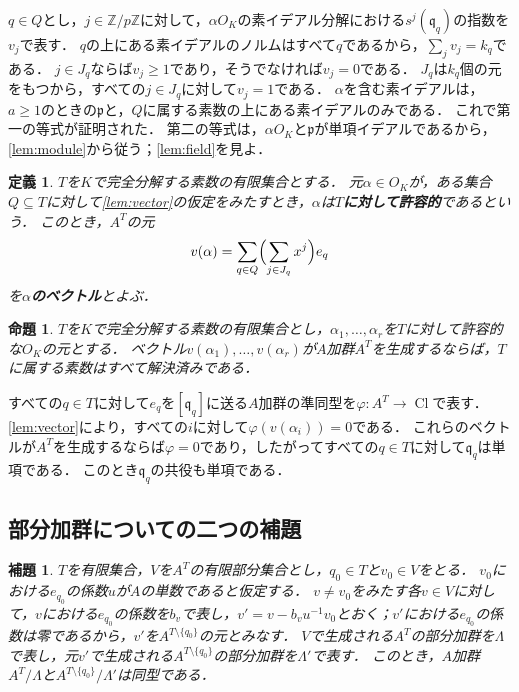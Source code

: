 \documentclass[11pt,a4paper]{ltjsarticle}
\makeatletter
\theoremstyle{ja}
\newtheorem{proposition}[theorem]{命題}
\newtheorem{lemma}[theorem]{補題}
\newtheorem{definition}[theorem]{定義}
\renewenvironment{proof}[1][証明]{\par
  \pushQED{\qed}\normalfont \topsep6\p@\@plus6\p@\relax
  \trivlist
  \item[\hskip\labelsep\bfseries #1]\hspace{1\zw}\ignorespaces
}{\popQED\endtrivlist\@endpefalse}
\makeatother
\begin{document}
\begin{proof}
$q \in Q$とし，$j \in \mathbb{Z}/p\mathbb{Z}$に対して，$\alpha O_K$の素イデアル分解における$s^j(\mathfrak{q}_q)$の指数を$v_j$で表す．
$q$の上にある素イデアルのノルムはすべて$q$であるから，$\sum_j v_j = k_q$である．
$j \in J_q$ならば$v_j \ge 1$であり，そうでなければ$v_j = 0$である．
$J_q$は$k_q$個の元をもつから，すべての$j \in J_q$に対して$v_j = 1$である．
$\alpha$を含む素イデアルは，$a \ge 1$のときの$\mathfrak{p}$と，$Q$に属する素数の上にある素イデアルのみである．
これで第一の等式が証明された．
第二の等式は，$\alpha O_K$と$\mathfrak{p}$が単項イデアルであるから，\cref{lem:module}から従う；\cref{lem:field}を見よ．
\end{proof}

\begin{definition} \label{def:vector}
$T$を$K$で完全分解する素数の有限集合とする．
元$\alpha \in O_K$が，ある集合$Q \subseteq T$に対して\cref{lem:vector}の仮定をみたすとき，$\alpha$は\textbf{$T$に対して許容的}であるという．
このとき，$A^T$の元
\[
v(\alpha) = \sum_{q \in Q} \Bigl( \sum_{j \in J_q} x^j \Bigr) e_q
\]
を\textbf{$\alpha$のベクトル}とよぶ．
\end{definition}

\begin{proposition} \label{prop:span}
$T$を$K$で完全分解する素数の有限集合とし，$\alpha_1, \dots, \alpha_r$を$T$に対して許容的な$O_K$の元とする．
ベクトル$v(\alpha_1), \dots, v(\alpha_r)$が$A$加群$A^T$を生成するならば，$T$に属する素数はすべて解決済みである．
\end{proposition}

\begin{proof}
すべての$q \in T$に対して$e_q$を$[\mathfrak{q}_q]$に送る$A$加群の準同型を$\varphi \colon A^T \to \operatorname{Cl}$で表す．
\cref{lem:vector}により，すべての$i$に対して$\varphi(v(\alpha_i)) = 0$である．
これらのベクトルが$A^T$を生成するならば$\varphi = 0$であり，したがってすべての$q \in T$に対して$\mathfrak{q}_q$は単項である．
このとき$\mathfrak{q}_q$の共役も単項である．
\end{proof}

\subsection{部分加群についての二つの補題}

\begin{lemma} \label{lem:pivot}
$T$を有限集合，$V$を$A^T$の有限部分集合とし，$q_0 \in T$と$v_0 \in V$をとる．
$v_0$における$e_{q_0}$の係数$u$が$A$の単数であると仮定する．
$v \ne v_0$をみたす各$v \in V$に対して，$v$における$e_{q_0}$の係数を$b_v$で表し，$v' = v - b_v u^{-1} v_0$とおく；$v'$における$e_{q_0}$の係数は零であるから，$v'$を$A^{T \setminus \{q_0\}}$の元とみなす．
$V$で生成される$A^T$の部分加群を$\Lambda$で表し，元$v'$で生成される$A^{T \setminus \{q_0\}}$の部分加群を$\Lambda'$で表す．
このとき，$A$加群$A^T/\Lambda$と$A^{T \setminus \{q_0\}}/\Lambda'$は同型である．
\end{lemma}
\end{document}
